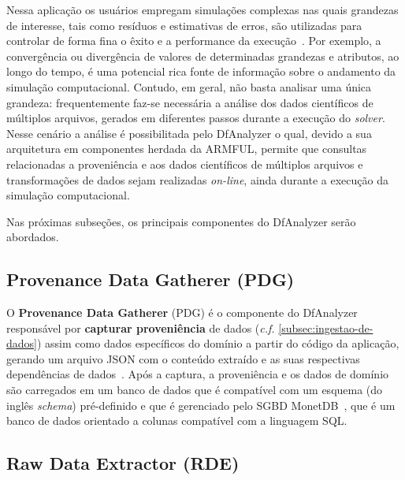 Nessa aplicação os usuários empregam simulações complexas nas quais grandezas de interesse, tais como resíduos e estimativas de erros, são utilizadas para controlar de forma fina o êxito e a performance da execução~\cite{silva2016situ}. Por exemplo, a convergência ou divergência de valores de determinadas grandezas e atributos, ao longo do tempo, é uma potencial rica fonte de informação sobre o andamento da simulação computacional. Contudo, em geral, não basta analisar uma única grandeza: frequentemente faz-se necessária a análise dos dados científicos de múltiplos arquivos, gerados em diferentes passos durante a execução do \textit{solver}. Nesse cenário a análise é possibilitada pelo DfAnalyzer o qual, devido a sua arquitetura em componentes herdada da ARMFUL, permite que consultas relacionadas a proveniência e aos dados científicos de múltiplos arquivos e transformações de dados sejam realizadas \textit{on-line}, ainda durante a execução da simulação computacional.

Nas próximas subseções, os principais componentes do DfAnalyzer serão abordados.

\subsection{Provenance Data Gatherer (PDG)}

O \textbf{Provenance Data Gatherer} (PDG) é o componente do DfAnalyzer responsável por \textbf{capturar proveniência} de dados (\textit{c.f.} \autoref{subsec:ingestao-de-dados}) assim como dados específicos do domínio a partir do código da aplicação, gerando um arquivo JSON com o conteúdo extraído e as suas respectivas dependências de dados~\cite{silva2016situ}. Após a captura, a proveniência e os dados de domínio são carregados em um banco de dados que é compatível com um esquema (do inglês \textit{schema}) pré-definido e que é gerenciado pelo SGBD MonetDB~\cite{boncz2008breaking}, que é um banco de dados orientado a colunas compatível com a linguagem SQL.



\subsection{Raw Data Extractor (RDE)}

